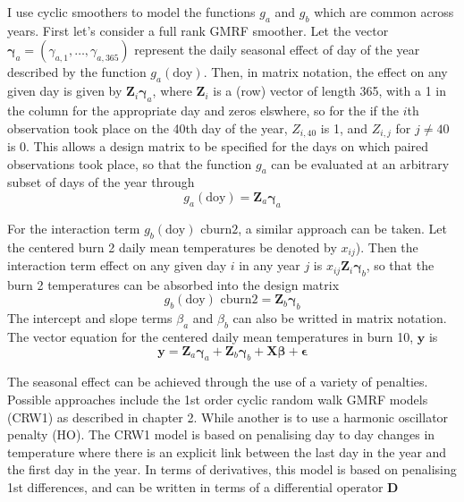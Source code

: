 I use cyclic smoothers to model the functions $g_a$ and $g_b$ which are common across years. First let's consider a full rank GMRF smoother. Let the vector $\bm{\gamma}_a = (\gamma_{a,1}, \ldots, \gamma_{a,365})$ represent the daily seasonal effect of day of the year described by the function $g_a(\text{doy})$. Then, in matrix notation, the effect on any given day is given by $\bm{Z}_i \bm{\gamma}_a$, where $\bm{Z}_i$ is a (row) vector of length 365, with a 1 in the column for the appropriate day and zeros elswhere, so for the if the $i$th observation took place on the 40th day of the year, $Z_{i,40}$ is 1, and $Z_{i,j}$ for $j \neq 40$ is 0.  This allows a design matrix to be specified for the days on which paired observations took place, so that the function $g_a$ can be evaluated at an arbitrary subset of days of the year through   
\begin{equation}
  g_a(\text{doy}) = \bm{Z}_a \bm{\gamma}_a
\end{equation}

For the interaction term $g_b(\text{doy})\text{ cburn2}$, a similar approach can be taken.
Let the centered burn 2 daily mean temperatures be denoted by $x_{ij}$).  Then the interaction term effect on any given day $i$ in any year $j$ is $x_{ij} \bm{Z}_i \bm{\gamma}_b$, so that the burn 2 temperatures can be absorbed into the design matrix
\begin{equation}
  g_b(\text{doy})\text{ cburn2} = \bm{Z}_b \bm{\gamma}_b
\end{equation}
The intercept and slope terms $\beta_a$ and $\beta_b$ can also be writted in matrix notation. The vector equation for the centered daily mean temperatures in burn 10, $\bm{y}$ is
\begin{equation}
  \bm{y} = \bm{Z}_a \bm{\gamma}_a + \bm{Z}_b \bm{\gamma}_b + \bm{X} \bm{\beta} + \bm{\epsilon}
\end{equation}



The seasonal effect can be achieved through the use of a variety of penalties. Possible approaches include the 1st order cyclic random walk GMRF models (CRW1) as described in chapter 2.  While  another is to use a harmonic oscillator penalty (HO). The CRW1 model is based on penalising day to day changes in temperature where there is an explicit link between the last day in the year and the first day in the year.  In terms of derivatives, this model is based on penalising 1st differences, and can be written in terms of a differential operator $\bm{D}$

